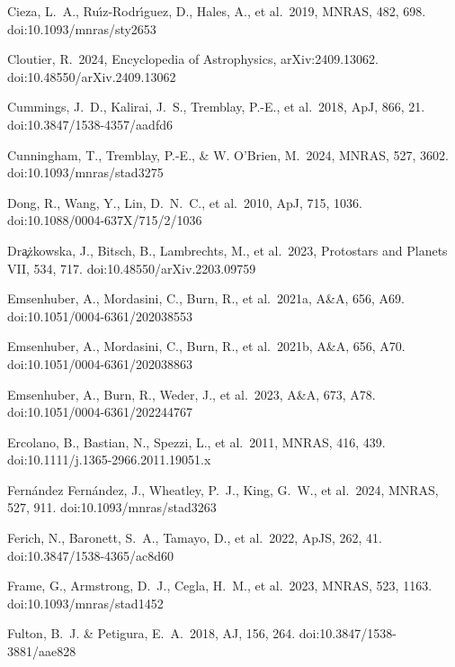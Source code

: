 \documentclass[useAMS,usenatbib]{mn2e}
\begin{document}
\begin{thebibliography}{99}
 Cieza, L.~A., Ru{\'\i}z-Rodr{\'\i}guez, D., Hales, A., et al.\ 2019, MNRAS, 482, 698. doi:10.1093/mnras/sty2653

 Cloutier, R.\ 2024, Encyclopedia of Astrophysics, arXiv:2409.13062. doi:10.48550/arXiv.2409.13062

 Cummings, J.~D., Kalirai, J.~S., Tremblay, P.-E., et al.\ 2018, ApJ, 866, 21. doi:10.3847/1538-4357/aadfd6

 Cunningham, T., Tremblay, P.-E., \& W. O'Brien, M.\ 2024, MNRAS, 527, 3602. doi:10.1093/mnras/stad3275

 Dong, R., Wang, Y., Lin, D.~N.~C., et al.\ 2010, ApJ, 715, 1036. doi:10.1088/0004-637X/715/2/1036

 Dr{\c{a}}{\.z}kowska, J., Bitsch, B., Lambrechts, M., et al.\ 2023, Protostars and Planets VII, 534, 717. doi:10.48550/arXiv.2203.09759

 Emsenhuber, A., Mordasini, C., Burn, R., et al.\ 2021a, A\&A, 656, A69. doi:10.1051/0004-6361/202038553

 Emsenhuber, A., Mordasini, C., Burn, R., et al.\ 2021b, A\&A, 656, A70. doi:10.1051/0004-6361/202038863

 Emsenhuber, A., Burn, R., Weder, J., et al.\ 2023, A\&A, 673, A78. doi:10.1051/0004-6361/202244767

 Ercolano, B., Bastian, N., Spezzi, L., et al.\ 2011, MNRAS, 416, 439. doi:10.1111/j.1365-2966.2011.19051.x

 Fern{\'a}ndez Fern{\'a}ndez, J., Wheatley, P.~J., King, G.~W., et al.\ 2024, MNRAS, 527, 911. doi:10.1093/mnras/stad3263

 Ferich, N., Baronett, S.~A., Tamayo, D., et al.\ 2022, ApJS, 262, 41. doi:10.3847/1538-4365/ac8d60

 Frame, G., Armstrong, D.~J., Cegla, H.~M., et al.\ 2023, MNRAS, 523, 1163. doi:10.1093/mnras/stad1452

 Fulton, B.~J. \& Petigura, E.~A.\ 2018, AJ, 156, 264. doi:10.3847/1538-3881/aae828


\end{thebibliography}
\end{document}
